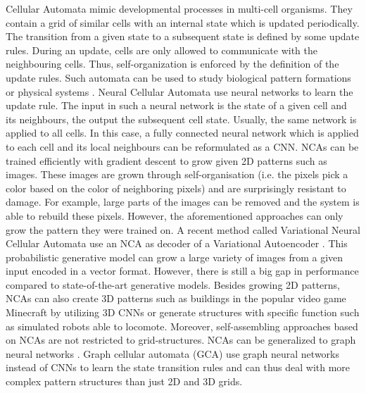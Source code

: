 Cellular Automata mimic developmental processes in multi-cell organisms.
They contain a grid of similar cells with an internal state which is updated periodically.
The transition from a given state to a subsequent state is defined by some update rules.
During an update, cells are only allowed to communicate with the neighbouring cells.
Thus, self-organization is enforced by the definition of the update rules.
Such automata can be used to study biological pattern formations  or physical systems .
Neural Cellular Automata  use neural networks to learn the update rule.
The input in such a neural network is the state of a given cell and its neighbours, the output the subsequent cell state.
Usually, the same network is applied to all cells.
In this case, a fully connected neural network which is applied to each cell and its local neighbours can be reformulated as a CNN.
NCAs can be trained efficiently with gradient descent to grow given 2D patterns such as images.
These images are grown through self-organisation (i.e. the pixels pick a color based on the color of neighboring pixels) and are surprisingly resistant to damage.
For example, large parts of the images can be removed and the system is able to rebuild these pixels.
However, the aforementioned approaches can only grow the pattern they were trained on.
A recent method called Variational Neural Cellular Automata  use an NCA as decoder of a Variational Autoencoder .
This probabilistic generative model can grow a large variety of images from a given input encoded in a vector format.
However, there is still a big gap in performance compared to state-of-the-art generative models.
Besides growing 2D patterns, NCAs can also create 3D patterns such as buildings in the popular video game Minecraft by utilizing 3D CNNs  or generate structures with specific function such as simulated robots able to locomote.
Moreover, self-assembling approaches based on NCAs are not restricted to grid-structures.
NCAs can be generalized to graph neural networks .
Graph cellular automata (GCA) use graph neural networks  instead of CNNs to learn the state transition rules and can thus deal with more complex pattern structures than just 2D and 3D grids.
